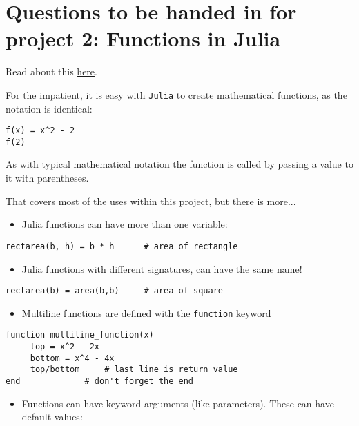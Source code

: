 \documentclass[12pt]{article}
\begin{document}
\section{Questions to be handed in for project 2: Functions in Julia}

Read about this \href{http://mth229.github.io/functions.html}{here}.

For the impatient, it is easy with \texttt{Julia} to create mathematical
functions, as the notation is identical:



\begin{verbatim}
f(x) = x^2 - 2
f(2)
\end{verbatim}
As with typical mathematical notation the function is called by passing
a value to it with parentheses.

That covers most of the uses within this project, but there is more...

\begin{itemize}
\itemsep1pt\parskip0pt
\item
  Julia functions can have more than one variable:
\end{itemize}



\begin{verbatim}
rectarea(b, h) = b * h      # area of rectangle
\end{verbatim}
\begin{itemize}
\itemsep1pt\parskip0pt
\item
  Julia functions with different signatures, can have the same name!
\end{itemize}



\begin{verbatim}
rectarea(b) = area(b,b)     # area of square
\end{verbatim}
\begin{itemize}
\itemsep1pt\parskip0pt
\item
  Multiline functions are defined with the \texttt{function} keyword
\end{itemize}



\begin{verbatim}
function multiline_function(x)
     top = x^2 - 2x
     bottom = x^4 - 4x
     top/bottom     # last line is return value
end             # don't forget the end
\end{verbatim}
\begin{itemize}
\itemsep1pt\parskip0pt
\item
  Functions can have keyword arguments (like parameters). These can have
  default values:
\end{itemize}
\end{document}
